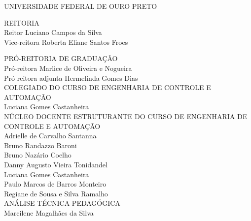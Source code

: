 \documentclass[
	12pt,				%
	openright,			%
	oneside,			%
	a4paper,			%
	english,			%
	brazil				%
	]{abntex2}
\begin{document}
 \begin{folhaderosto}
\thispagestyle{empty}
\begin{center}
    UNIVERSIDADE FEDERAL DE OURO PRETO
    \vspace*{1cm}

REITORIA\\
Reitor Luciano Campos da Silva \\
Vice-reitora Roberta Eliane Santos Froes \\
\vspace*{1cm}

PRÓ-REITORIA DE GRADUAÇÃO\\
Pró-reitora Marlice de Oliveira e Nogueira \\
Pró-reitora adjunta Hermelinda Gomes Dias \\
\vspace*{1cm}
COLEGIADO DO CURSO DE ENGENHARIA DE CONTROLE E AUTOMAÇÃO \\
Luciana Gomes Castanheira \\
\vspace*{1cm}
NÚCLEO DOCENTE ESTRUTURANTE DO CURSO DE ENGENHARIA DE CONTROLE E AUTOMAÇÃO \\
Adrielle de Carvalho Santanna \\
Bruno Randazzo Baroni \\
Bruno Nazário Coelho \\
Danny Augusto Vieira Tonidandel \\
Luciana Gomes Castanheira \\
Paulo Marcos de Barros Monteiro \\
Regiane de Sousa e Silva Ramalho \\
\vspace*{1cm}
ANÁLISE TÉCNICA PEDAGÓGICA \\
Marcilene Magalhães da Silva \\

\vspace*{\fill}

\large\imprimirdata
\end{center}
 \end{folhaderosto}
\tableofcontents*
\cleardoublepage
%     
\end{document}

